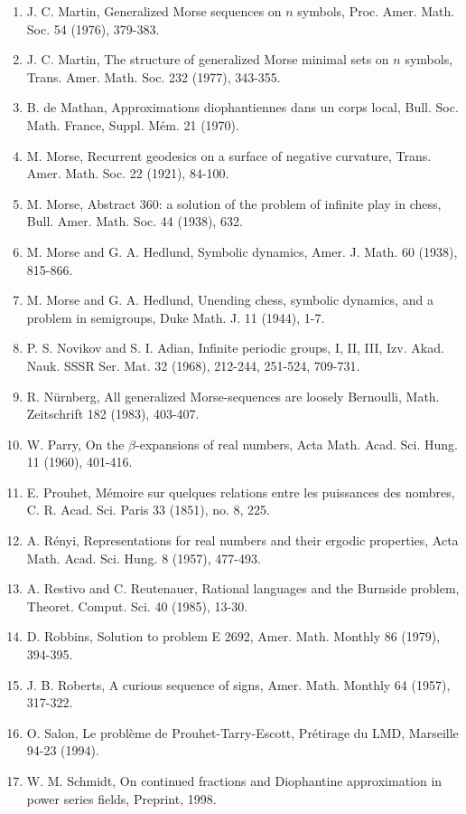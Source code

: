 \documentclass[10pt]{article}
\begin{document}
\begin{enumerate}
  \item J. C. Martin, Generalized Morse sequences on $n$ symbols, Proc. Amer. Math. Soc. 54 (1976), 379-383.
  \item J. C. Martin, The structure of generalized Morse minimal sets on $n$ symbols, Trans. Amer. Math. Soc. 232 (1977), 343-355.
  \item B. de Mathan, Approximations diophantiennes dans un corps local, Bull. Soc. Math. France, Suppl. Mém. 21 (1970).
  \item M. Morse, Recurrent geodesics on a surface of negative curvature, Trans. Amer. Math. Soc. 22 (1921), 84-100.
  \item M. Morse, Abstract 360: a solution of the problem of infinite play in chess, Bull. Amer. Math. Soc. 44 (1938), 632.
  \item M. Morse and G. A. Hedlund, Symbolic dynamics, Amer. J. Math. 60 (1938), 815-866.
  \item M. Morse and G. A. Hedlund, Unending chess, symbolic dynamics, and a problem in semigroups, Duke Math. J. 11 (1944), 1-7.
  \item P. S. Novikov and S. I. Adian, Infinite periodic groups, I, II, III, Izv. Akad. Nauk. SSSR Ser. Mat. 32 (1968), 212-244, 251-524, 709-731.
  \item R. Nürnberg, All generalized Morse-sequences are loosely Bernoulli, Math. Zeitschrift 182 (1983), 403-407.
  \item W. Parry, On the $\beta$-expansions of real numbers, Acta Math. Acad. Sci. Hung. 11 (1960), 401-416.
  \item E. Prouhet, Mémoire sur quelques relations entre les puissances des nombres, C. R. Acad. Sci. Paris 33 (1851), no. 8, 225.
  \item A. Rényi, Representations for real numbers and their ergodic properties, Acta Math. Acad. Sci. Hung. 8 (1957), 477-493.
  \item A. Restivo and C. Reutenauer, Rational languages and the Burnside problem, Theoret. Comput. Sci. 40 (1985), 13-30.
  \item D. Robbins, Solution to problem E 2692, Amer. Math. Monthly 86 (1979), 394-395.
  \item J. B. Roberts, A curious sequence of signs, Amer. Math. Monthly 64 (1957), 317-322.
  \item O. Salon, Le problème de Prouhet-Tarry-Escott, Prétirage du LMD, Marseille 94-23 (1994).
  \item W. M. Schmidt, On continued fractions and Diophantine approximation in power series fields, Preprint, 1998.

\end{enumerate}
\end{document}
